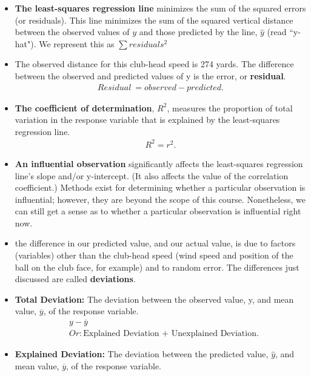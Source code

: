 \documentclass{report}
\begin{document}
\begin{itemize}
        \item \textbf{The least-squares regression line} minimizes the sum of the squared errors (or residuals). This line minimizes the sum of the squared vertical distance between the observed values of $y$  and those predicted by the line, $\hat{y}$  (read “y-hat"). We represent this as $\sum residuals^{2}$
        \item The observed distance for this club-head speed is 274 yards. The difference between the observed and predicted values of y is the error, or \textbf{residual}.
            \begin{align*}
                Residual\ = observed - predicted
            .\end{align*}
        \item \textbf{The coefficient of determination}, $R^{2}$, measures the proportion of total variation in the response variable that is explained by the least-squares regression line.
            \begin{align*}
                R^{2} = r^{2}
            .\end{align*}
        \item \textbf{An influential observation} significantly affects the least-squares regression line's slope and/or y-intercept. (It also affects the value of the correlation coefficient.) Methods exist for determining whether a particular observation is influential; however, they are beyond the scope of this course. Nonetheless, we can still get a sense as to whether a particular observation is influential right now.
        \item the difference in our predicted value, and our actual value, is due to factors (variables) other than the club-head speed (wind speed and position of the ball on the club face, for example) and to random error. The differences just discussed are called \textbf{deviations}.
        \item \textbf{Total Deviation:} The deviation between the observed value, y, and mean value, $\overline{y} $, of the response variable.
            \begin{align*}
                &y - \overline{y} \\
                &Or: \text{Explained Deviation + Unexplained Deviation}
            .\end{align*}
        \item \textbf{Explained Deviation:} The deviation between the predicted value, $\hat{y} $, and mean value, $\overline{y} $, of the response variable.
            \begin{align*}

\end{align*}
\end{itemize}
\end{document}
